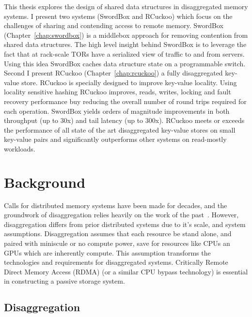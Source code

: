 \documentclass[12pt]{ucsddissertation}
\newcommand{\sword}{SwordBox}
\begin{document}
\begin{dissertationintroduction}
This thesis explores the design of shared data structures in disaggregated memory systems.  I
present two systems ({\sword} and RCuckoo) which focus on the challenges of sharing and contending
access to remote memory. {\sword} (Chapter~\ref{chap:swordbox}) is a middlebox approach for removing
contention from shared data structures. The high level insight behind {\sword} is to leverage the
fact that at rack-scale TORs have a serialized view of traffic to and from servers. Using this idea
{\sword} caches data structure state on a programmable switch. 
Second I present RCuckoo (Chapter~\ref{chap:rcuckoo}) a fully disaggregated key-value store. RCuckoo
is specially designed to improve key-value locality. Using locality sensitive hashing RCuckoo
improves, reads, writes, locking and fault recovery performance buy reducing the overall number of
round trips required for each operation.
{\sword} yields orders of magnitude improvements in both
throughput (up to 30x) and tail latency (up to 300x).  RCuckoo meets or exceeds the performance of
all state of the art disaggregated key-value stores on small key-value pairs and significantly
outperforms other systems on read-mostly workloads.

\end{dissertationintroduction}

\chapter{Background}

Calls for distributed memory systems have been made for decades, and the groundwork of
disaggregation relies heavily on the work of the past~\cite{treadmarks,gms}. However, disaggregation
differs from prior distributed systems due to it's scale, and system assumptions. Disaggregation
assumes that each resource be stand alone, and paired with miniscule or no compute power, save for
resources like CPUs an GPUs which are inherently compute.  This assumption transforms the
technologies and requirements for disaggregated systems. Critically Remote Direct Memory Access
(RDMA) (or a similar CPU bypass technology) is essential in constructing a passive storage system.

\section{Disaggregation}
\end{document}
